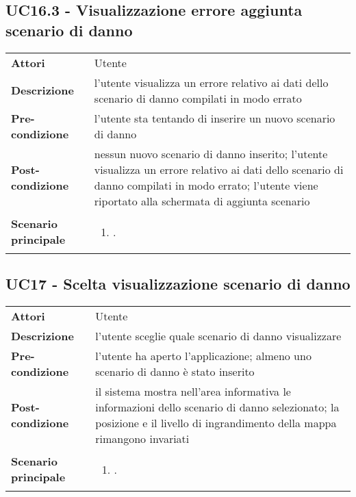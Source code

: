\subsection{UC16.3 - Visualizzazione errore aggiunta scenario di danno} 
\label{sssec:UC16.3} 
\def\arraystretch{1.5}
\begin{tabularx}{\textwidth}{l|p{}}
	\rowcolor{I} \multicolumn{2}{c}{\color{white}\textbf{UC16.3 - Visualizzazione errore aggiunta scenario di danno}} \\
	\toprule
	\endhead
	\textbf{Attori} & Utente\\
	\textbf{Descrizione} & l'utente visualizza un errore relativo ai dati dello scenario di danno compilati in modo errato\\
	\textbf{Pre-condizione} & l'utente sta tentando di inserire un nuovo scenario di danno\\
	\textbf{Post-condizione} & nessun nuovo scenario di danno inserito;  l'utente visualizza un errore relativo ai dati dello scenario di danno compilati in modo errato; l'utente viene riportato alla schermata di aggiunta scenario\\
	\textbf{Scenario principale} & \vspace{-1.2em}\begin{enumerate}[leftmargin=*,noitemsep,nosep]
		\item \nameref{sssec:UC16.3}.
	\end{enumerate}\\
	\bottomrule
\end{tabularx}
\subsection{UC17 - Scelta visualizzazione scenario di danno} 
\label{sssec:UC17} 
\def\arraystretch{1.5}
\begin{tabularx}{\textwidth}{l|p{}}
	\rowcolor{I} \multicolumn{2}{c}{\color{white}\textbf{UC17 - Scelta visualizzazione scenario di danno}} \\
	\toprule
	\endhead
	\textbf{Attori} & Utente\\
	\textbf{Descrizione} & l'utente sceglie quale scenario di danno visualizzare\\
	\textbf{Pre-condizione} & l'utente ha aperto l'applicazione; almeno uno scenario di danno è stato inserito\\
	\textbf{Post-condizione} & il sistema mostra nell'area informativa le informazioni dello scenario di danno selezionato; la posizione e il livello di ingrandimento della mappa rimangono invariati\\
	\textbf{Scenario principale} & \vspace{-1.2em}\begin{enumerate}[leftmargin=*,noitemsep,nosep]
		\item \nameref{sssec:UC17}.
	\end{enumerate}\\
	\bottomrule
\end{tabularx}
